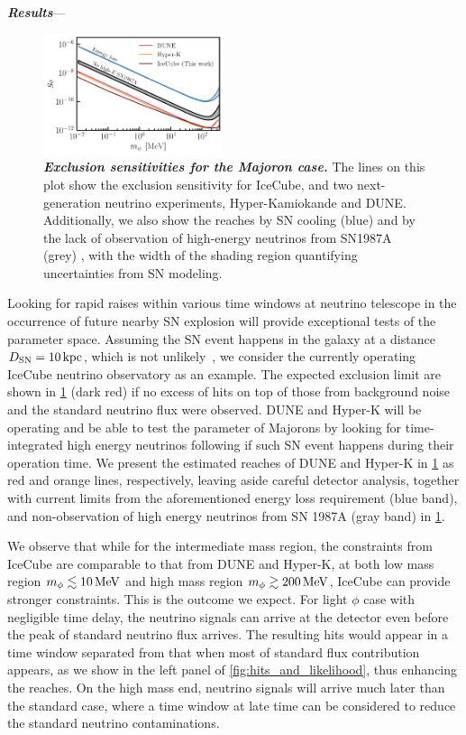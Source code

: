 \textbf{\textit{Results}}---
\begin{figure}[t!]
    \centering
    \includegraphics[width=0.47\textwidth]{figures/majoran_sensitivity}
    \caption{\textbf{\textit{Exclusion sensitivities for the Majoron case.}}
    The lines on this plot show the exclusion sensitivity for IceCube, and two next-generation neutrino experiments, Hyper-Kamiokande and DUNE.
    Additionally, we also show the reaches by SN cooling (blue) and by the lack of observation of high-energy neutrinos from SN1987A (grey) \cite{Fiorillo:2022cdq}, with the width of the shading region quantifying uncertainties from SN modeling.
    }
    \label{fig:sensitivity}
\end{figure}
Looking for rapid raises within various time windows at neutrino telescope in the occurrence of future nearby SN explosion will provide exceptional tests of the parameter space. Assuming the SN event happens in the galaxy at a distance $D_{\rm SN}=\unit[10]{kpc}$, which is not unlikely~\cite{Reed:2005en,Rozwadowska:2020nab}, we consider the currently operating IceCube neutrino observatory as an example. 
The expected exclusion limit are shown in \cref{fig:sensitivity} (dark red) if no excess of hits on top of those from background noise and the standard neutrino flux were observed. DUNE and Hyper-K will be operating and be able to test the parameter of Majorons by looking for time-integrated high energy neutrinos following \cite{Fiorillo:2022cdq} if such SN event happens during their operation time. We present the estimated reaches of DUNE and Hyper-K in \cref{fig:sensitivity} as red and orange lines, respectively, leaving aside careful detector analysis, together with current limits \cite{Fiorillo:2022cdq} from the aforementioned energy loss requirement (blue band), and non-observation of high energy neutrinos from SN 1987A (gray band) in \cref{fig:sensitivity}. 

We observe that while for the intermediate mass region, the constraints from IceCube are comparable to that from DUNE and Hyper-K, at both low mass region $m_\phi \lesssim \unit[10]{MeV}$ and high mass region $m_\phi \gtrsim \unit[200]{MeV}$, IceCube can provide stronger constraints. This is the outcome we expect. For light $\phi$ case with negligible time delay, the neutrino signals can  arrive at the detector even before the peak of standard neutrino flux arrives. The resulting hits would appear in a time window separated from that when most of standard flux contribution appears, as we show in the left panel of \cref{fig:hits_and_likelihood}, thus enhancing the reaches. On the high mass end, neutrino signals will arrive much later than the standard case, where a time window at late time can be considered to reduce the standard neutrino contaminations. 

